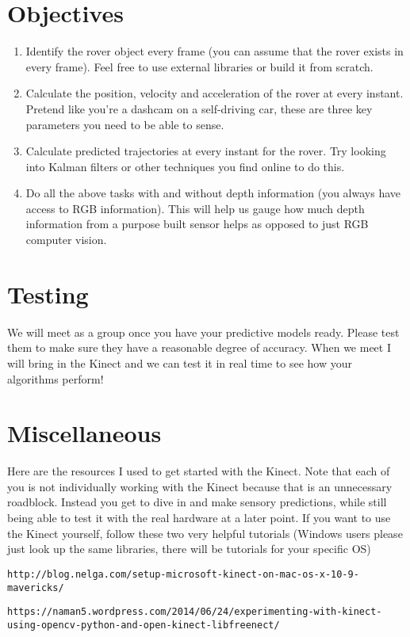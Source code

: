 \documentclass[a4paper]{article}
\begin{document}
\section{Objectives}
\begin{enumerate}
 \item
    Identify the rover object every frame (you can assume that the rover exists in every frame). Feel free to use external libraries or build it from scratch.
  \item 
    Calculate the position, velocity and acceleration of the rover at every instant. Pretend like you're a dashcam on a self-driving car, these are three key parameters you need to be able to sense.
  \item
    Calculate predicted trajectories at every instant for the rover. Try looking into Kalman filters or other techniques you find online to do this.
  \item
    Do all the above tasks with and without depth information (you always have access to RGB information). This will help us gauge how much depth information from a purpose built sensor helps as opposed to just RGB computer vision.
\end{enumerate}

\section{Testing}
We will meet as a group once you have your predictive models ready. Please test them to make sure they have a reasonable degree of accuracy. When we meet I will bring in the Kinect and we can test it in real time to see how your algorithms perform!

\section{Miscellaneous}
Here are the resources I used to get started with the Kinect. Note that each of you is not individually working with the Kinect because that is an unnecessary roadblock. Instead you get to dive in and make sensory predictions, while still being able to test it with the real hardware at a later point. If you want to use the Kinect yourself, follow these two very helpful tutorials (Windows users please just look up the same libraries, there will be tutorials for your specific OS)
\begin{lstlisting}[breaklines] 
http://blog.nelga.com/setup-microsoft-kinect-on-mac-os-x-10-9-mavericks/
\end{lstlisting} 
\begin{lstlisting}[breaklines]
https://naman5.wordpress.com/2014/06/24/experimenting-with-kinect-using-opencv-python-and-open-kinect-libfreenect/ 
\end{lstlisting}
\end{document}
